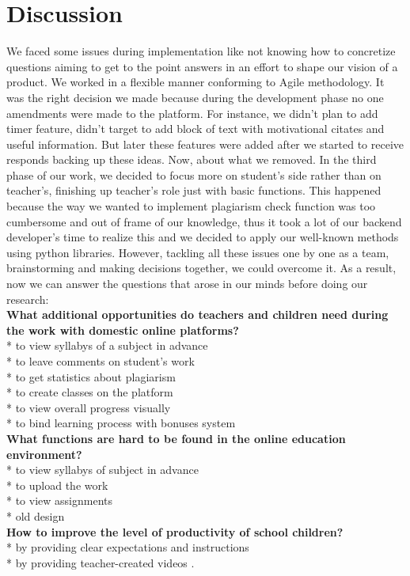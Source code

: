 \chapter{Discussion}\label{ch:disc}
We faced some issues during implementation like not knowing how to concretize questions aiming to get to the point answers in an effort to shape our vision of a product. We worked in a flexible manner conforming to Agile methodology. It was the right decision we made because during the development phase no one amendments were made to the platform. For instance, we didn't plan to add timer feature, didn't target to add block of text with motivational citates and useful information. But later these features were added after we started to receive responds backing up these ideas. Now, about what we removed. In the third phase of our work, we decided to focus more on student's side rather than on teacher's, finishing up teacher's role just with basic functions. This happened because the way we wanted to implement plagiarism check function was too cumbersome and out of frame of our knowledge, thus it took a lot of our backend developer's time to realize this and we decided to apply our well-known methods using python libraries.    
However, tackling all these issues one by one as a team, brainstorming and making decisions together, we could overcome it. 
As a result, now we can answer the questions that arose in our minds before doing our research:\\
\textbf{What additional opportunities do teachers and children need during the work with domestic online platforms? } \\
* to view syllabys of a subject in advance\\
* to leave comments on student's work\\
* to get statistics about plagiarism\\
* to create classes on the platform\\
* to view overall progress visually\\
* to bind learning process with bonuses system\\
\textbf{What functions are hard to be found in the online education environment?}\\
* to view syllabys of subject in advance\\
* to upload the work\\
* to view assignments\\
* old design\\
\textbf{How to improve the level of productivity of school children?}\\
* by providing clear expectations and instructions\\
* by providing teacher-created videos \cite{bond2020facilitating}.\\
